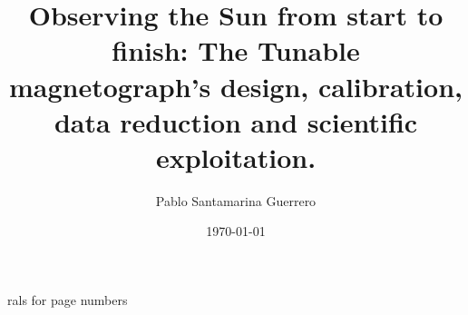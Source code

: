 \documentclass[12pt]{mythesis}
\title{Observing the Sun from start to finish: The Tunable magnetograph's design, calibration, data reduction and scientific exploitation.}
\author{Pablo Santamarina Guerrero}
\date{\today}
\begin{document}
\frontmatter %
\maketitle
\cleardoublepage







\tableofcontents

\mainmatter %
rals for page numbers






%

%





\cleardoublepage
\layout
\end{document}
